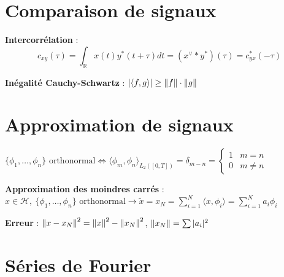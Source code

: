 
\section{Comparaison de signaux}

\textbf{Intercorrélation} : $$c_{xy}(\tau) = \int_\mathbb{R} x(t) y^*(t+\tau) dt = (x^\vee * y^*)(\tau) = c_{yx}^*(-\tau)$$

\textbf{Inégalité Cauchy-Schwartz} : $|\langle f,g \rangle| \geq \left\lVert f\right\rVert\cdot\left\lVert g\right\rVert$



\section{Approximation de signaux}

$\{\phi_1, \dots, \phi_n\} \text{ orthonormal} \Leftrightarrow \langle \phi_m, \phi_n \rangle_{L_2([0, T])} = \delta_{m-n} = 
\begin{cases}
1 & m = n \\
0 & m \neq n
\end{cases}
$

\textbf{Approximation des moindres carrés} : $x\in \mathcal{H}, \: \{\phi_1, \dots, \phi_n\} \text{ orthonormal} \rightarrow \tilde x = x_N = \sum_{i=1}^N \langle x, \phi_i \rangle = \sum_{i=1}^N a_i \phi_i$

\textbf{Erreur} : $\left\lVert x-x_N\right\rVert^2 = \left\lVert x\right\rVert^2 - \left\lVert x_N\right\rVert^2$, $\left\lVert x_N\right\rVert = \sum |a_i|^2$




\section{Séries de Fourier}

